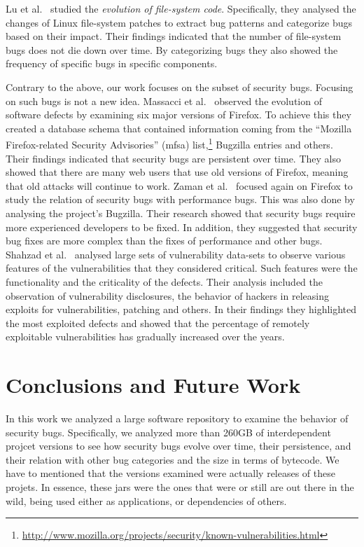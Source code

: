 \documentclass[conference]{llncs}
\begin{document}
Lu et al.~\cite{LAAL13} studied the {\it evolution of file-system code}.
Specifically, they analysed the changes of Linux file-system patches to extract
bug patterns and categorize bugs based on their impact. Their findings
indicated that the number of file-system bugs does not die down over time. By
categorizing bugs they also showed the frequency of specific bugs in specific
components.

Contrary to the above, our work focuses on the subset of security bugs.
Focusing on such bugs is not a new idea. Massacci et al.~\cite{MNN11} observed
the evolution of software defects by examining six major versions of Firefox.
To achieve this they created a database schema that contained information
coming from the ``Mozilla Firefox-related Security Advisories'' ({\sc mfsa})
list,\footnote{\url{http://www.mozilla.org/projects/security/known-vulnerabilities.html}}
Bugzilla entries and others. Their findings indicated that security bugs are
persistent over time. They also showed that there are many web users that use
old versions of Firefox, meaning that old attacks will continue to work.
Zaman et al.~\cite{ZAH11} focused again on Firefox to study the relation of
security bugs with performance bugs. This was also done by analysing the project's
Bugzilla. Their research showed that security bugs require more experienced developers
to be fixed. In addition, they suggested that security bug fixes are more complex than the
fixes of performance and other bugs.
Shahzad et al.~\cite{SSL12} analysed large sets of vulnerability data-sets to observe
various features of the vulnerabilities that they considered critical. Such features
were the functionality and the criticality of the defects. Their analysis
included the observation of vulnerability disclosures, the behavior of
hackers in releasing exploits for vulnerabilities, patching and others. In
their findings they highlighted the most exploited defects and showed that
the percentage of remotely exploitable vulnerabilities has gradually increased
over the years.

\section{Conclusions and Future Work}
\label{sec:con}

In this work we analyzed a large software repository to examine the behavior
of security bugs. Specifically, we analyzed more than 260GB of interdependent
projcet versions to see how security bugs evolve over time, their
persistence, and their relation with other bug categories and the size in
terms of bytecode. We have to mentioned that the versions examined were
actually releases of these projets. In essence, these {\sc jar}s were the ones
that were or still are out there in the wild, being used either as
applications, or dependencies of others.
\end{document}
